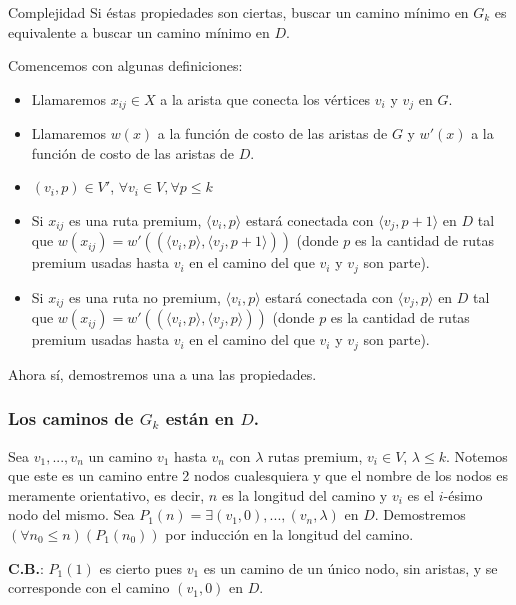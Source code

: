 \begin{subsection}{Complejidad}
Si éstas propiedades son ciertas, buscar un camino mínimo en $G_k$ es equivalente a buscar un camino mínimo en $D$. 

Comencemos con algunas definiciones:
\begin{itemize}
\item Llamaremos $x_{ij} \in X$ a la arista que conecta los vértices $v_i$ y $v_j$ en $G$. 

\item Llamaremos $w(x)$ a la función de costo de las aristas de $G$ y $w'(x)$ a la función de costo de las aristas de $D$.

\item $(v_i, p) \in V'$, $\forall v_i \in V, \forall p \leq k$

\item Si $x_{ij}$ es una ruta premium, $\langle v_i, p \rangle$ estará conectada con $\langle v_j, p+1 \rangle$ en $D$ tal que $w(x_{ij}) = w'((\langle v_i, p\rangle, \langle v_j, p+1\rangle))$ (donde $p$ es la cantidad de rutas premium usadas hasta $v_i$ en el camino del que $v_i$ y $v_j$ son parte).

\item Si $x_{ij}$ es una ruta no premium, $\langle v_i, p \rangle$ estará conectada con $\langle v_j, p \rangle$ en $D$ tal que $w(x_{ij}) = w'((\langle v_i, p\rangle, \langle v_j, p\rangle))$ (donde $p$ es la cantidad de rutas premium usadas hasta $v_i$ en el camino del que $v_i$ y $v_j$ son parte).

\end{itemize}

Ahora sí, demostremos una a una las propiedades.

\subsubsection*{Los caminos de $G_k$ están en $D$.}

Sea $v_1, ..., v_n$ un camino $v_1$ hasta $v_n$ con $\lambda$ rutas premium, $v_i \in V$, $\lambda \leq k$. Notemos que este es un camino entre 2 nodos cualesquiera y que el nombre de los nodos es meramente orientativo, es decir, $n$ es la longitud del camino y $v_i$ es el $i$-ésimo nodo del mismo. Sea $P_1(n) = \exists (v_1, 0), ..., (v_n, \lambda )$ en $D$. Demostremos $(\forall n_0 \leq n)(P_1(n_0))$ por inducción en la longitud del camino.

\textbf{C.B.}: 
$P_1(1)$  es cierto pues $v_1$ es un camino de un único nodo, sin aristas, y se corresponde con el camino $(v_1, 0)$ en $D$.


\end{subsection}
